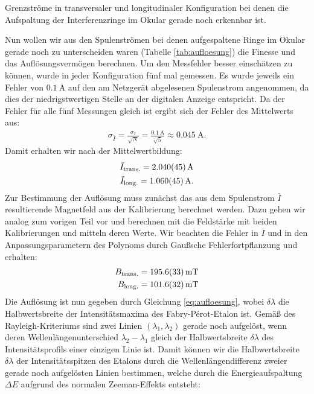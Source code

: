 \documentclass[11pt, a4paper]{article}
\begin{document}
\begin{table}[h]
	\centering
	
	\caption{Grenzströme in transversaler und longitudinaler Konfiguration bei denen die Aufspaltung der Interferenzringe im Okular gerade noch erkennbar ist.}
	\label{tab:aufloesung}
\end{table}
Nun wollen wir aus den Spulenströmen bei denen aufgespaltene Ringe im Okular gerade noch zu unterscheiden waren (Tabelle \ref{tab:aufloesung}) die Finesse und das Auflösungsvermögen berechnen.
Um den Messfehler besser einschätzen zu können, wurde in jeder Konfiguration fünf mal gemessen.
Es wurde jeweils ein Fehler von $\SI{0.1}{\ampere}$ auf den am Netzgerät abgelesenen Spulenstrom angenommen, da dies der niedrigstwertigen Stelle an der digitalen Anzeige entspricht.
Da der Fehler für alle fünf Messungen gleich ist ergibt sich der Fehler des Mittelwerts aus: 
\begin{align*}
	\sigma_{\bar{I}} = \frac{\sigma_I}{\sqrt{N}} = \frac{\SI{0,1}{\ampere}}{\sqrt{5}} \approx \SI{0,045}{\ampere}\text{.}
\end{align*}
Damit erhalten wir nach der Mittelwertbildung:
\begin{align*}
	\bar{I}_\mathrm{trans.} = \SI{2.040 +- 0.045}{\ampere} \\
	\bar{I}_\mathrm{long.} = \SI{1.060 +- 0.045}{\ampere}\text{.}
\end{align*}
Zur Bestimmung der Auflösung muss zunächst das aus dem Spulenstrom $\bar{I}$ resultierende Magnetfeld aus der Kalibrierung berechnet werden.
Dazu gehen wir analog zum vorigen Teil vor und berechnen mit die Feldstärke mit beiden Kalibrierungen und mitteln deren Werte.
Wir beachten die Fehler in $\bar{I}$ und in den Anpassungsparametern des Polynoms durch Gaußsche Fehlerfortpflanzung und erhalten:
\begin{align*}
	B_\mathrm{trans.} = \SI{195.6 +- 3.3}{\milli\tesla} \\
	B_\mathrm{long.} = \SI{101.6 +- 3.2}{\milli\tesla}
\end{align*}
Die Auflösung ist nun gegeben durch Gleichung \ref{eq:aufloesung}, wobei $\delta \lambda$ die Halbwertsbreite der Intensitätsmaxima des Fabry-Pérot-Etalon ist.
Gemäß des Rayleigh-Kriteriums sind zwei Linien $(\lambda_1, \lambda_2)$ gerade noch aufgelöst, wenn deren Wellenlängenunterschied $\lambda_2 - \lambda_1$ gleich der Halbwertsbreite $\delta \lambda$ des Intensitätsprofils einer einzigen Linie ist.
Damit können wir die Halbwertsbreite $\delta \lambda$ der Intensitätsspitzen des Etalons durch die Wellenlängendifferenz zweier gerade noch aufgelösten Linien bestimmen, welche durch die Energieaufspaltung $\Delta E$ aufgrund des normalen Zeeman-Effekts entsteht:
\end{document}

